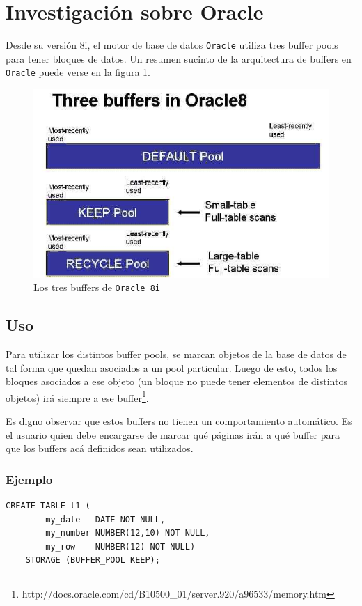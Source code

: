 \section{Investigación sobre Oracle}

Desde su versión 8i, el motor de base de datos \texttt{Oracle} utiliza tres buffer pools para tener bloques de datos. Un resumen sucinto de la arquitectura de buffers en \texttt{Oracle} puede verse en la figura \ref{fotito}.

\begin{figure}[H]\centering
	\includegraphics[scale=0.5]{keepRecycle.jpg}
	\caption{Los tres buffers de \texttt{Oracle 8i}}
	\label{fotito}
\end{figure}
\subsection{Uso}
Para utilizar los distintos buffer pools, se marcan objetos de la base de datos de tal forma que quedan asociados a un pool particular. Luego de esto, todos los bloques asociados a ese objeto (un bloque no puede tener elementos de distintos objetos) irá siempre a ese buffer\footnote{http://docs.oracle.com/cd/B10500\_01/server.920/a96533/memory.htm}. 

Es digno observar que estos buffers no tienen un comportamiento automático. Es el usuario quien debe encargarse de marcar qué páginas irán a qué buffer para que los buffers acá definidos sean utilizados. 

\subsubsection{Ejemplo}
\begin{Verbatim}[xleftmargin=-3em]
	CREATE TABLE t1 (
		my_date   DATE NOT NULL,
		my_number NUMBER(12,10) NOT NULL,
		my_row    NUMBER(12) NOT NULL)
	STORAGE (BUFFER_POOL KEEP);	
\end{Verbatim}

